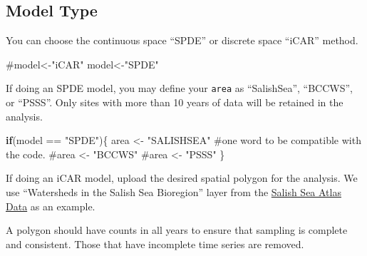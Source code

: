 \documentclass[
  letterpaper,
  DIV=11,
  numbers=noendperiod]{scrreprt}
\newenvironment{Shaded}{\begin{snugshade}}{\end{snugshade}}
\newcommand{\CommentTok}[1]{\textcolor[rgb]{0.37,0.37,0.37}{#1}}
\newcommand{\ControlFlowTok}[1]{\textcolor[rgb]{0.00,0.23,0.31}{\textbf{#1}}}
\newcommand{\NormalTok}[1]{\textcolor[rgb]{0.00,0.23,0.31}{#1}}
\newcommand{\OtherTok}[1]{\textcolor[rgb]{0.00,0.23,0.31}{#1}}
\newcommand{\SpecialCharTok}[1]{\textcolor[rgb]{0.37,0.37,0.37}{#1}}
\newcommand{\StringTok}[1]{\textcolor[rgb]{0.13,0.47,0.30}{#1}}
\begin{document}
\subsection{Model Type}\label{3.1.1Analysis}

You can choose the continuous space ``SPDE'' or discrete space ``iCAR''
method.

\begin{Shaded}
\begin{Highlighting}[]
\CommentTok{\#model\textless{}{-}"iCAR"}
\NormalTok{model}\OtherTok{\textless{}{-}}\StringTok{"SPDE"}
\end{Highlighting}
\end{Shaded}

If doing an SPDE model, you may define your \texttt{area} as
``SalishSea'', ``BCCWS'', or ``PSSS''. Only sites with more than 10
years of data will be retained in the analysis.

\begin{Shaded}
\begin{Highlighting}[]
\ControlFlowTok{if}\NormalTok{(model }\SpecialCharTok{==} \StringTok{"SPDE"}\NormalTok{)\{}
\NormalTok{area }\OtherTok{\textless{}{-}} \StringTok{"SALISHSEA"} \CommentTok{\#one word to be compatible with the code.}
\CommentTok{\#area \textless{}{-} "BCCWS"}
\CommentTok{\#area \textless{}{-} "PSSS"}
\NormalTok{\}}
\end{Highlighting}
\end{Shaded}

If doing an iCAR model, upload the desired spatial polygon for the
analysis. We use ``Watersheds in the Salish Sea Bioregion'' layer from
the \href{https://salish-sea-atlas-data-wwu.hub.arcgis.com/}{Salish Sea
Atlas Data} as an example.

A polygon should have counts in all years to ensure that sampling is
complete and consistent. Those that have incomplete time series are
removed.
\end{document}
